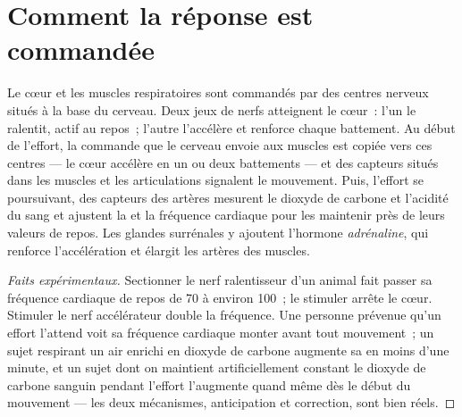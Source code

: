 \section{Comment la réponse est commandée}

\begin{proposition}\label{prop:g10:heart-lungs-effort:control}
Le cœur et les muscles respiratoires sont commandés par des centres
nerveux situés à la base du cerveau. Deux jeux de nerfs atteignent le
cœur~: l'un le ralentit, actif au repos~; l'autre l'accélère et
renforce chaque battement. Au début de l'effort, la commande que le
cerveau envoie aux muscles est copiée vers ces centres --- le cœur
accélère en un ou deux battements --- et des capteurs situés dans les
muscles et les articulations signalent le mouvement. Puis, l'effort se
poursuivant, des capteurs des artères mesurent le dioxyde de carbone et
l'acidité du sang et ajustent la  et la fréquence cardiaque
pour les maintenir près de leurs valeurs de repos. Les glandes
surrénales y ajoutent l'hormone \emph{adrénaline},
qui renforce l'accélération et élargit les artères des muscles.
\end{proposition}
\begin{proof}[Faits expérimentaux]
Sectionner le nerf ralentisseur d'un animal fait passer sa fréquence
cardiaque de repos de 70 à environ 100~; le stimuler arrête le cœur.
Stimuler le nerf accélérateur double la fréquence. Une personne
prévenue qu'un effort l'attend voit sa fréquence cardiaque monter avant
tout mouvement~; un sujet respirant un air enrichi en dioxyde de
carbone augmente sa  en moins d'une minute, et un sujet dont
on maintient artificiellement constant le dioxyde de carbone sanguin
pendant l'effort l'augmente quand même dès le début du mouvement ---
les deux mécanismes, anticipation et correction, sont bien réels.
\end{proof}

